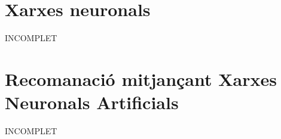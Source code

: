 \section{Xarxes neuronals}

INCOMPLET

\section{Recomanació mitjançant Xarxes Neuronals Artificials}
\label{sec:estat-de-lart-ann}
INCOMPLET

\begin{comment}
El camp de la recomanació mitjançant Xarxes Neuronals Artificials (d'ara en endevant ANN, que que són les sigues per a Artificial Neural Network) és un tema que ha estat tractat en multitut de tesis.

Es pot apreciar que és factible el desenvolupament d'una ANN mitjançant xarxes neuronals. És pot desenvolupar aquest sistema de recomanació tant basant-se en contingut (Content Based Filtering) com basant-se en les opinions dels demés usuaris d'una aplicació (Collaborative Filtering).

El principal problema de les xarxes neuronals és que tenen un temps d'aprenentatge molt llarg\cite{faster-ann-recomender}. Hi ha un estudi\cite{collaborative-filtering-som-cbr} que, el que fà, és utilitzar una ANN per tal de categoritzar els patrons dels usuaris. Aquest proces és dut com un proces \emph{off-line}, que no necesita ser executat cada cop que un usuari solicita una recomanació. Mitjançant alguns altres algoritmes d'aprenentatge, acaba donant recomanacions de forma considerablement ràpida.

Com es pot veure, hi ha hagut bastanta investigació en aquest camp, el que fa que disposem de bastanta documentació per a desenvolupar el projecte.
\end{comment}